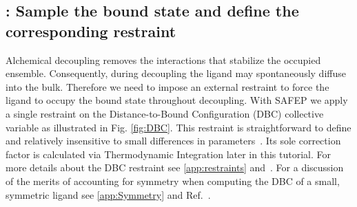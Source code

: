 \documentclass[9pt,tutorial]{Styling/livecoms}
\begin{document}
\renewcommand\thesubsection{Step \Alph{subsection}}
\subsection{\hspace{-1em}: Sample the bound state and define the corresponding restraint}\label{step:equilibrium}
    \begin{tcolorbox}[colback=blue!5!white,colframe=blue!75!black] 
    Alchemical decoupling removes the interactions that stabilize the occupied ensemble. 
    Consequently, during decoupling the ligand may spontaneously diffuse into the bulk. 
    Therefore we need to impose an external restraint to force the ligand to occupy the bound state throughout decoupling. 
    With SAFEP we apply a single restraint on the Distance-to-Bound Configuration (DBC) collective variable as illustrated in Fig. \ref{fig:DBC}. 
    This restraint is straightforward to define and relatively insensitive to small differences in parameters~\cite{Salari2018}.
    Its sole correction factor is calculated via Thermodynamic Integration later in this tutorial. 
    For more details about the DBC restraint see \ref{app:restraints} and~\cite{Salari2018}. 
    For a discussion of the merits of accounting for symmetry when computing the DBC of a small, symmetric ligand see \ref{app:Symmetry} and Ref.~.
    \end{tcolorbox}
    
\end{document}
